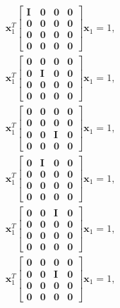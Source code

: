 \documentclass{article}
\newcommand{\mbf}[1]{\mathbf{#1}}
\begin{document}
\begin{align}
    \mbf{x}_1^T  \begin{bmatrix} \mbf{I} & \mbf{0} & \mbf{0} & \mbf{0} \\ \mbf{0} & \mbf{0} & \mbf{0} & \mbf{0} \\ \mbf{0} & \mbf{0} & \mbf{0} & \mbf{0} \\ \mbf{0} & \mbf{0} & \mbf{0} & \mbf{0} \end{bmatrix} \mbf{x}_1 = 1,\\
    \mbf{x}_1^T  \begin{bmatrix} \mbf{0} & \mbf{0} & \mbf{0} & \mbf{0} \\ \mbf{0} & \mbf{I} & \mbf{0} & \mbf{0} \\ \mbf{0} & \mbf{0} & \mbf{0} & \mbf{0} \\ \mbf{0} & \mbf{0} & \mbf{0} & \mbf{0} \end{bmatrix} \mbf{x}_1 = 1,\\
    \mbf{x}_1^T  \begin{bmatrix} \mbf{0} & \mbf{0} & \mbf{0} & \mbf{0} \\ \mbf{0} & \mbf{0} & \mbf{0} & \mbf{0} \\ \mbf{0} & \mbf{0} & \mbf{I} & \mbf{0} \\ \mbf{0} & \mbf{0} & \mbf{0} & \mbf{0} \end{bmatrix} \mbf{x}_1 = 1,\\
    \mbf{x}_1^T  \begin{bmatrix} \mbf{0} & \mbf{I} & \mbf{0} & \mbf{0} \\ \mbf{0} & \mbf{0} & \mbf{0} & \mbf{0} \\ \mbf{0} & \mbf{0} & \mbf{0} & \mbf{0} \\ \mbf{0} & \mbf{0} & \mbf{0} & \mbf{0} \end{bmatrix} \mbf{x}_1 = 1,\\
    \mbf{x}_1^T  \begin{bmatrix} \mbf{0} & \mbf{0} & \mbf{I} & \mbf{0} \\ \mbf{0} & \mbf{0} & \mbf{0} & \mbf{0} \\ \mbf{0} & \mbf{0} & \mbf{0} & \mbf{0} \\ \mbf{0} & \mbf{0} & \mbf{0} & \mbf{0} \end{bmatrix} \mbf{x}_1 = 1,\\
    \mbf{x}_1^T  \begin{bmatrix} \mbf{0} & \mbf{0} & \mbf{0} & \mbf{0} \\ \mbf{0} & \mbf{0} & \mbf{I} & \mbf{0} \\ \mbf{0} & \mbf{0} & \mbf{0} & \mbf{0} \\ \mbf{0} & \mbf{0} & \mbf{0} & \mbf{0} \end{bmatrix} \mbf{x}_1 = 1,\\
\end{align}
\end{document}
